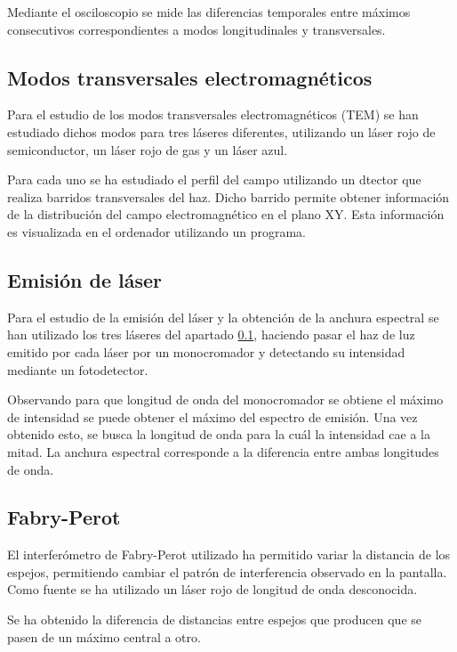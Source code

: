 \documentclass[twoside]{article}
\begin{document}
\begin{multicols}{2}
				Mediante el osciloscopio se mide las diferencias temporales entre máximos consecutivos correspondientes a modos longitudinales y transversales.

			\subsection{Modos transversales electromagnéticos}
				\label{sec:TEM}

				Para el estudio de los modos transversales electromagnéticos (TEM) se han estudiado dichos modos para tres láseres diferentes, utilizando un láser rojo de semiconductor, un láser rojo de gas y un láser azul.

				Para cada uno se ha estudiado el perfil del campo utilizando un dtector que realiza barridos transversales del haz. Dicho barrido permite obtener información de la distribución del campo electromagnético en el plano XY. Esta información es visualizada en el ordenador utilizando un programa.

			\subsection{Emisión de láser}

				Para el estudio de la emisión del láser y la obtención de la anchura espectral se han utilizado los tres láseres del apartado \ref{sec:TEM}, haciendo pasar el haz de luz emitido por cada láser por un monocromador y detectando su intensidad mediante un fotodetector.

				Observando para que longitud de onda del monocromador se obtiene el máximo de intensidad se puede obtener el máximo del espectro de emisión. Una vez obtenido esto, se busca la longitud de onda para la cuál la intensidad cae a la mitad. La anchura espectral corresponde a la diferencia entre ambas longitudes de onda.

			\subsection{Fabry-Perot}

				El interferómetro de Fabry-Perot utilizado ha permitido variar la distancia de los espejos, permitiendo cambiar el patrón de interferencia observado en la pantalla. Como fuente se ha utilizado un láser rojo de longitud de onda desconocida.

				Se ha obtenido la diferencia de distancias entre espejos que producen que se pasen de un máximo central a otro.


\end{multicols}
\end{document}

